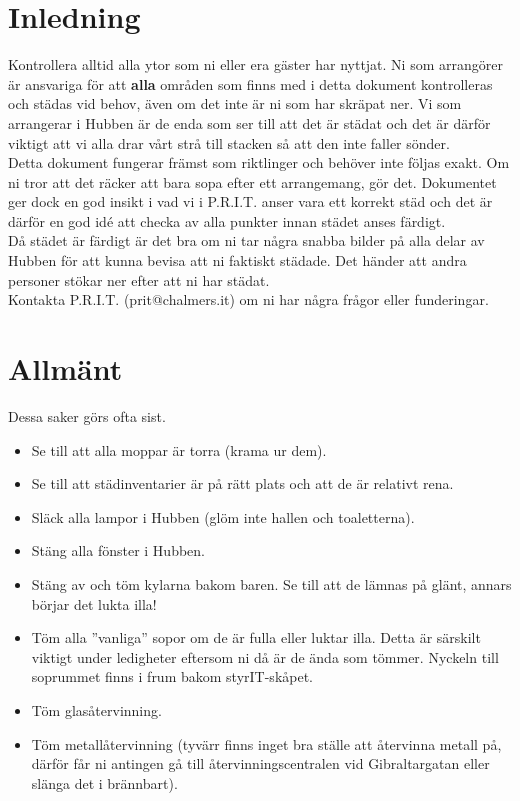 
\section{Inledning}
Kontrollera alltid alla ytor som ni eller era gäster har nyttjat. Ni som arrangörer är ansvariga för att \textbf{alla} områden som finns med i detta dokument kontrolleras och städas vid behov, även om det inte är ni som har skräpat ner. Vi som arrangerar i Hubben är de enda som ser till att det är städat och det är därför viktigt att vi alla drar vårt strå till stacken så att den inte faller sönder.\\

Detta dokument fungerar främst som riktlinger och behöver inte följas exakt. Om ni tror att det räcker att bara sopa efter ett arrangemang, gör det. Dokumentet ger dock en god insikt i vad vi i P.R.I.T. anser vara ett korrekt städ och det är därför en god idé att checka av alla punkter innan städet anses färdigt.\\

Då städet är färdigt är det bra om ni tar några snabba bilder på alla delar av Hubben för att kunna bevisa att ni faktiskt städade. Det händer att andra personer stökar ner efter att ni har städat.\\

Kontakta P.R.I.T. (prit@chalmers.it) om ni har några frågor eller funderingar.

\section{Allmänt}
Dessa saker görs ofta sist.
\begin{itemize}
    \item Se till att alla moppar är torra (krama ur dem).
    \item Se till att städinventarier är på rätt plats och att de är relativt rena.
    \item Släck alla lampor i Hubben (glöm inte hallen och toaletterna).
    \item Stäng alla fönster i Hubben.
    \item Stäng av och töm kylarna bakom baren. Se till att de lämnas på glänt, annars börjar det lukta illa!
    \item Töm alla ''vanliga'' sopor om de är fulla eller luktar illa. Detta är särskilt viktigt under ledigheter eftersom ni då är de ända som tömmer. Nyckeln till soprummet finns i frum bakom styrIT-skåpet.
    \item Töm glasåtervinning.
    \item Töm metallåtervinning (tyvärr finns inget bra ställe att återvinna metall på, därför får ni antingen gå till återvinningscentralen vid Gibraltargatan eller slänga det i brännbart).
\end{itemize}


